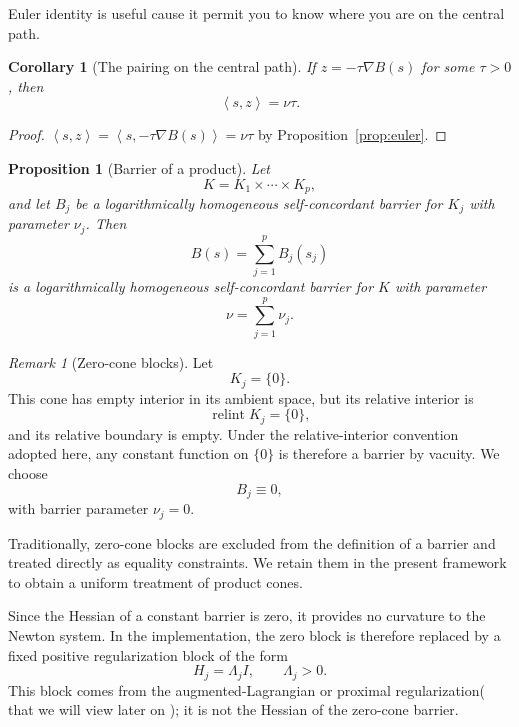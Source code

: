 \documentclass[a4paper,11pt]{book}
\theoremstyle{plain}
\newtheorem{proposition}[theorem]{Proposition}
\newtheorem{corollary}[theorem]{Corollary}
\theoremstyle{definition}
\theoremstyle{remark}
\newtheorem{remark}[theorem]{Remark}
\numberwithin{equation}{chapter}
\numberwithin{algorithm}{chapter}
\newcommand{\inner}[2]{\left\langle #1, #2 \right\rangle}
\newcommand{\relint}{\operatorname{relint}}
\begin{document}
	Euler identity is useful cause it permit you to know where you are on the central path.
	
	\begin{corollary}[The pairing on the central path]\label{cor:pairing}
		If $z=-\tau\nabla B(s)$ for some $\tau>0$, then
		\begin{equation}
			\inner{s}{z}=\nu\tau .
		\end{equation}
	\end{corollary}
	
	\begin{proof}
		$\inner{s}{z}=\inner{s}{-\tau \nabla B(s)}=\nu\tau$
		by Proposition~\ref{prop:euler}.
	\end{proof}
	
	\begin{proposition}[Barrier of a product]
		Let
		\[
		K=K_1\times\cdots\times K_p,
		\]
		and let \(B_j\) be a logarithmically homogeneous self-concordant barrier for
		\(K_j\) with parameter \(\nu_j\). Then
		\begin{equation}
			B(s)
			=
			\sum_{j=1}^pB_j(s_j)
		\end{equation}
		is a logarithmically homogeneous self-concordant barrier for \(K\) with
		parameter
		\begin{equation}
			\nu=\sum_{j=1}^p\nu_j.
		\end{equation}
	\end{proposition}
	
	\begin{remark}[Zero-cone blocks]
		Let
		\[
		K_j=\{0\}.
		\]
		This cone has empty interior in its ambient space, but its relative interior
		is
		\[
		\relint K_j=\{0\},
		\]
		and its relative boundary is empty. Under the relative-interior convention
		adopted here, any constant function on \(\{0\}\) is therefore a barrier by
		vacuity. We choose
		\[
		B_j\equiv0,
		\]
		with barrier parameter \(\nu_j=0\).
		
		Traditionally, zero-cone blocks are excluded from the definition of a
		barrier and treated directly as equality constraints. We retain them in the
		present framework to obtain a uniform treatment of product cones.
		
		Since the Hessian of a constant barrier is zero, it provides no curvature
		to the Newton system. In the implementation, the zero block is therefore
		replaced by a fixed positive regularization block of the form
		\[
		H_j=\Lambda_j I,
		\qquad
		\Lambda_j>0.
		\]
		This block comes from the augmented-Lagrangian or proximal regularization( that we will view later on );
		it is not the Hessian of the zero-cone barrier.
	\end{remark}
	
\end{document}
